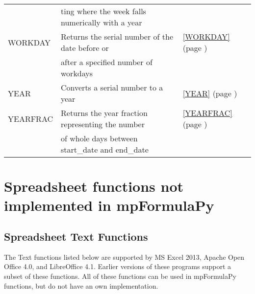 \begin{center}
\begin{longtable}{l l l }
		& ting where the week falls numerically with a year &   \\
		WORKDAY & Returns the serial number of the date before or   &  \ref{WORKDAY} (page \pageref{WORKDAY}) \index{Spreadsheet Functions!WORKDAY} \\
		& after a specified number of workdays & \\
		YEAR  & Converts a serial number to a year &  \ref{YEAR} (page \pageref{YEAR}) \index{Spreadsheet Functions!YEAR} \\
		YEARFRAC & Returns the year fraction representing the number  &  \ref{YEARFRAC} (page \pageref{YEARFRAC}) \index{Spreadsheet Functions!YEARFRAC} \\
		& of whole days between start\_date and end\_date &   \\
	\end{longtable}
\end{center}





\newpage 
\section{Spreadsheet functions not implemented in mpFormulaPy}
\subsection{Spreadsheet Text Functions}
The Text functions listed below are supported by MS Excel 2013, Apache Open Office 4.0, and LibreOffice 4.1. Earlier versions of these programs support a subset of these functions.
All of these functions can be used in mpFormulaPy functions, but do not have an own implementation. 




